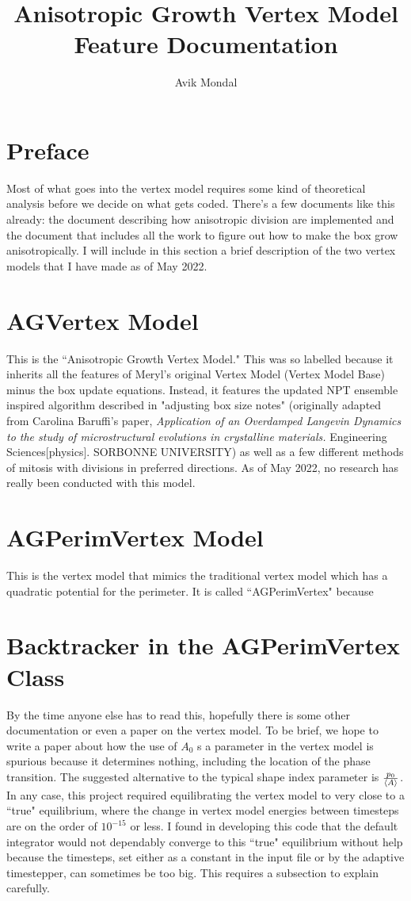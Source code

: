 \documentclass[12pt,a4paper]{article}
\begin{document}
\title{ Anisotropic Growth Vertex Model Feature Documentation }
\author{Avik Mondal}
\maketitle
\tableofcontents
\section{Preface}
Most of what goes into the vertex model requires some kind of theoretical analysis before we decide on what gets coded. There's a few documents like this already: the document describing how anisotropic division are implemented and the document that includes all the work to figure out how to make the box grow anisotropically. I will include in this section a brief description of the two vertex models that I have made as of May 2022. 

\section{AGVertex Model}
This is the ``Anisotropic Growth Vertex Model." This was so labelled because it inherits all the features of Meryl's original Vertex Model (Vertex Model Base) minus the box update equations. Instead, it features the updated NPT ensemble inspired algorithm described in "adjusting box size notes" (originally adapted from Carolina Baruffi's paper, \textit{Application of an Overdamped Langevin Dynamics to the study of microstructural evolutions in crystalline materials.} Engineering Sciences[physics]. SORBONNE UNIVERSITY) as well as a few different methods of mitosis with divisions in preferred directions. As of May 2022, no research has really been conducted with this model.

\section{AGPerimVertex Model}
This is the vertex model that mimics the traditional vertex model which has a quadratic potential for the perimeter. It is called ``AGPerimVertex" because 

\section{Backtracker in the AGPerimVertex Class}
By the time anyone else has to read this, hopefully there is some other documentation or even a paper on the vertex model. To be brief, we hope to write a paper about how the use of $A_0$ s a parameter in the vertex model is spurious because it determines nothing, including the location of the phase transition. The suggested alternative to the typical shape index parameter is $\frac{p_0}{\expval{A}}$. In any case, this project required equilibrating the vertex model to very close to a ``true" equilibrium, where the change in vertex model energies between timesteps are on the order of $10^{-15}$ or less. I found in developing this code that the default integrator would not dependably converge to this ``true" equilibrium without help because the timesteps, set either as a constant in the input file or by the adaptive timestepper, can sometimes be too big. This requires a subsection to explain carefully.
\end{document}
